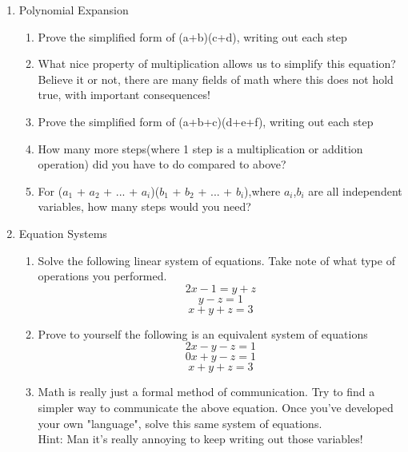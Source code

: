 \documentclass{article}
\begin{document}
\begin{enumerate}

    \item Polynomial Expansion
    \begin{enumerate}
        \item Prove the simplified form of (a+b)(c+d), writing out each step
        \item What nice property of multiplication allows us to simplify this equation?\\
        Believe it or not, there are many fields of math where this does not hold true, with important consequences!
        \item Prove the simplified form of (a+b+c)(d+e+f), writing out each step
        \item How many more steps(where 1 step is a multiplication or addition operation) did you have to do compared to above?
        \item For ($a_1$ + $a_2$ + ... + $a_i$)($b_1$ + $b_2$ + ... + $b_i$),where $a_i$,$b_i$ are all independent variables, how many steps would you need? 
    \end{enumerate}
    
    \item Equation Systems
    \begin{enumerate} 
        \item  Solve the following linear system of equations. Take note of what type of operations you performed.
        \[ 2x - 1 = y + z  \]
        \[ y-z = 1  \]
        \[ x+y+z = 3  \]
        \item Prove to yourself the following is an equivalent system of equations
        \[ 2x -y - z = 1  \]
        \[0x + y-z = 1  \]
        \[ x+y+z = 3  \]
        \item Math is really just a formal method of communication. Try to find a simpler way to communicate the above equation. Once you've developed your own "language", solve this same system of equations.\\
        Hint: Man it's really annoying to keep writing out those variables!
    \end{enumerate}
    

\end{enumerate}
\end{document}
